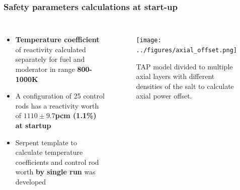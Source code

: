 \begin{frame}
\frametitle{Safety parameters calculations at start-up}       

\begin{columns}
	\column{6cm}
	\begin{itemize}
		\item \textbf{Temperature coefficient} of reactivity calculated 
		separately for fuel and moderator in range \textbf{800-1000K}
		\item A configuration of 25 control rods has a reactivity worth of 
		\textbf{$1110\pm9.7$pcm (1.1\%) at startup}
		\item Serpent template to calculate temperature coefficients and  
		control rod worth \textbf{by single run} was developed
	\end{itemize}
	
	\column{6.5cm}
	\begin{figure}[bth!] %
	\texttt{[image: ../figures/axial\_offset.png]}
	\caption{\gls{TAP} model divided to multiple axial layers with different 
	densities of the salt to calculate axial power offset.}
	\end{figure}
\end{columns}
\end{frame}

